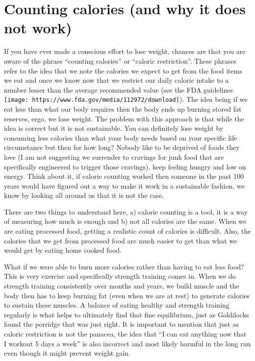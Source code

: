 \documentclass[
  oneside]{book}
\begin{document}
\hypertarget{counting-calories-and-why-it-does-not-work}{%
\section{Counting calories (and why it does not work)}\label{counting-calories-and-why-it-does-not-work}}

If you have ever made a conscious effort to lose weight, chances are that you are aware of the phrase ``counting calories'' or ``caloric restriction''. These phrases refer to the idea that we note the calories we expect to get from the food items we eat and once we know now that we restrict our daily caloric intake to a number lesser than the average recommended value (see the FDA guidelines \texttt{[image: https://www.fda.gov/media/112972/download]}). The idea being if we eat less than what our body requires then the body ends up burning stored fat reserves, ergo, we lose weight. The problem with this approach is that while the idea is correct but it is not sustainable. You can definitely lose weight by consuming less calories than what your body needs based on your specific life circumstance but then for how long? Nobody like to be deprived of foods they love (I am not suggesting we surrender to cravings for junk food that are specifically engineered to trigger those cravings), keep feeling hungry and low on energy. Think about it, if calorie counting worked then someone in the past 100 years would have figured out a way to make it work in a sustainable fashion, we know by looking all around us that it is not the case.

There are two things to understand here, a) calorie counting is a tool, it is a way of measuring how much is enough and b) not all calories are the same. When we are eating processed food, getting a realistic count of calories is difficult. Also, the calories that we get from processed food are much easier to get than what we would get by eating home cooked food.

What if we were able to burn more calories rather than having to eat less food? This is very exercise and specifically strength training comes in. When we do strength training consistently over months and years, we build muscle and the body then has to keep burning fat (even when we are at rest) to generate calories to sustain these muscles. A balance of eating healthy and strength training regularly is what helps to ultimately find that fine equilibrium, just as Goldilocks found the porridge that was just right. It is important to mention that just as caloric restriction is not the panacea, the idea that ``I can eat anything now that I workout 5 days a week'' is also incorrect and most likely harmful in the long run even though it might prevent weight gain.
\end{document}
